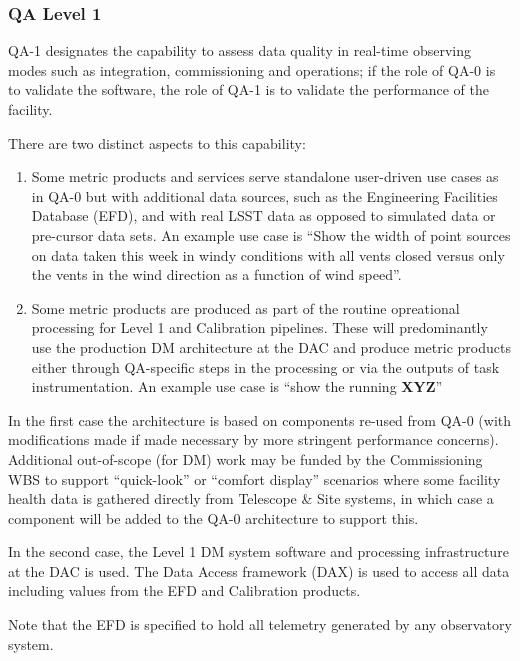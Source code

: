 \subsubsection{QA Level 1}

QA-1 designates the capability to assess data quality in real-time
observing modes such as integration, commissioning and operations; if the role of QA-0 is to validate the software, the role of QA-1 is to validate the performance of the facility.

There are two distinct aspects to this capability:

\begin{enumerate}
\item Some metric products and services serve standalone user-driven use cases as in QA-0 but with additional data sources, such as the Engineering Facilities Database (EFD), and with real LSST data as opposed to simulated data or pre-cursor data sets.  An example use case is ``Show the width of point sources on data taken this week in windy conditions with all vents closed versus only the vents in the wind direction as a function of wind speed''.

\item Some metric products are produced as part of the routine opreational processing for Level 1 and Calibration pipelines. These will predominantly use the production DM architecture at the DAC and produce metric products either through QA-specific steps in the processing or via the outputs of task instrumentation. An example use case is ``show the running {\bf XYZ}''

\end{enumerate}

In the first case the architecture is based on components re-used from
QA-0 (with modifications made if made necessary by more stringent
performance concerns). Additional out-of-scope (for DM) work may be
funded by the Commissioning WBS to support ``quick-look'' or ``comfort
display'' scenarios where some facility health data is gathered
directly from Telescope \& Site systems, in which case a component will
be added to the QA-0 architecture to support this.

In the second case, the Level 1 DM system software and processing
infrastructure at the DAC is used. The Data Access framework (DAX) is
used to access all data including values from the EFD and
Calibration products.

Note that the EFD is specified to hold all telemetry generated by any observatory system.

